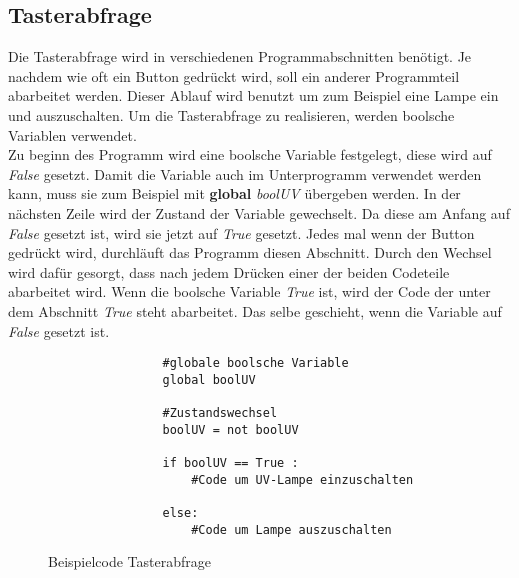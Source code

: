 \subsection{Tasterabfrage}\label{sec:Tasterabfrage}
\SecAuth{\nameSH}
Die Tasterabfrage wird in verschiedenen Programmabschnitten benötigt. Je nachdem wie oft ein Button gedrückt wird, soll ein anderer Programmteil abarbeitet werden. Dieser Ablauf wird benutzt um zum Beispiel eine Lampe ein und auszuschalten. Um die Tasterabfrage zu realisieren, werden boolsche Variablen verwendet. \\
\vspace{2mm}
Zu beginn des Programm wird eine boolsche Variable festgelegt, diese wird auf \textit{False} gesetzt. Damit die Variable auch im Unterprogramm verwendet werden kann, muss sie zum Beispiel mit \textbf{global} \textit{boolUV} übergeben werden. In der nächsten Zeile wird der Zustand der Variable gewechselt. Da diese am Anfang auf \textit{False} gesetzt ist, wird sie jetzt auf \textit{True} gesetzt. Jedes mal wenn der Button gedrückt wird, durchläuft das Programm diesen Abschnitt. Durch den Wechsel wird dafür gesorgt, dass nach jedem Drücken einer der beiden Codeteile abarbeitet wird. Wenn die boolsche Variable \textit{True} ist, wird der Code der unter dem Abschnitt \textit{True} steht abarbeitet. Das selbe geschieht, wenn die Variable auf \textit{False} gesetzt ist.\\
\vspace{3mm}
\begin{figure}[h]
    \centering
    \begin{verbatim}
                #globale boolsche Variable
                global boolUV

                #Zustandswechsel
                boolUV = not boolUV

                if boolUV == True :
                    #Code um UV-Lampe einzuschalten
        
                else:
                    #Code um Lampe auszuschalten
    \end{verbatim}
    \caption{Beispielcode Tasterabfrage}
\end{figure}